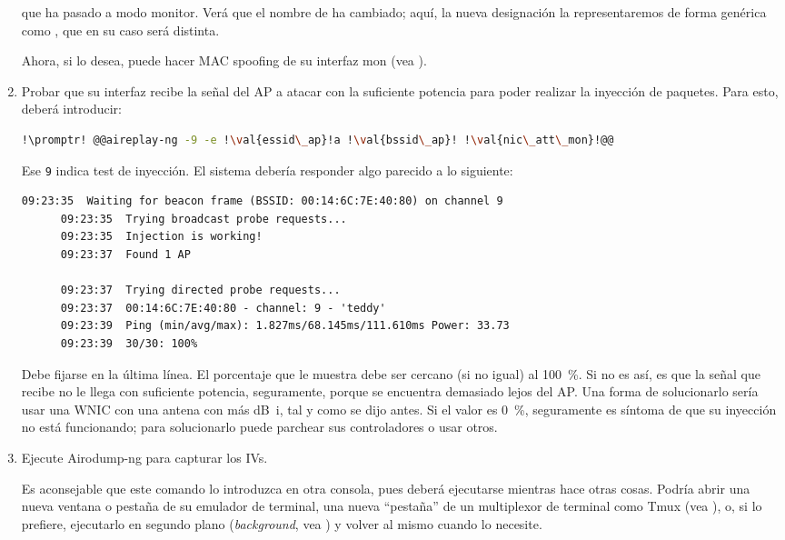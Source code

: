 \begin{enumerate}
    \noindent que  ha pasado a modo monitor. Verá que el nombre de  ha cambiado;
    aquí, la nueva designación la representaremos de forma genérica como , que en su caso
    será distinta.

    Ahora, si lo desea, puede hacer MAC spoofing de su interfaz mon (vea ).

  \item Probar que su interfaz  recibe la señal del AP a atacar con la suficiente potencia
    para poder realizar la inyección de paquetes. Para esto, deberá introducir:

    \begin{lstlisting}[gobble=6,language=bash,style=bashinteract,escapechar=!]
      !\promptr! @@aireplay-ng -9 -e !\val{essid\_ap}!a !\val{bssid\_ap}! !\val{nic\_att\_mon}!@@
    \end{lstlisting}

    \noindent Ese \lstinline!9! indica test de inyección. El sistema debería responder algo parecido a lo
    siguiente:

    \begin{lstlisting}[gobble=6,style=bashinteract]
      09:23:35  Waiting for beacon frame (BSSID: 00:14:6C:7E:40:80) on channel 9
      09:23:35  Trying broadcast probe requests...
      09:23:35  Injection is working!
      09:23:37  Found 1 AP

      09:23:37  Trying directed probe requests...
      09:23:37  00:14:6C:7E:40:80 - channel: 9 - 'teddy'
      09:23:39  Ping (min/avg/max): 1.827ms/68.145ms/111.610ms Power: 33.73
      09:23:39  30/30: 100%
    \end{lstlisting}

    \noindent Debe fijarse en la última línea. El porcentaje que le muestra debe ser cercano (si no igual) al
    \SI{100}{\percent}. Si no es así, es que la señal que recibe no le llega con suficiente potencia,
    seguramente, porque se encuentra demasiado lejos del AP. Una forma de solucionarlo sería usar una WNIC con
    una antena con más \si{\deci\bel i}, tal y como se dijo antes. Si el valor es \SI{0}{\percent}, seguramente
    es síntoma de que su inyección no está funcionando; para solucionarlo puede parchear sus controladores o
    usar otros.

  \item Ejecute Airodump-ng para capturar los IVs.

    Es aconsejable que este comando lo introduzca en otra consola, pues deberá ejecutarse mientras hace otras
    cosas. Podría abrir una nueva ventana o pestaña de su emulador de terminal, una nueva ``pestaña'' de un
    multiplexor de terminal como Tmux (vea ), o, si lo prefiere, ejecutarlo en segundo plano
    (\foreignlanguage{english}{\textit{background}}, vea ) y volver al mismo cuando lo
    necesite.


\end{enumerate}
